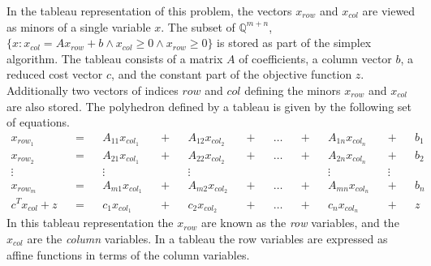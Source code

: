 \documentclass[11pt]{article} %
\begin{document}
In the tableau representation of this problem, the vectors $x_{row}$ and $x_{col}$ are viewed as minors of a single variable $x$. The subset of $\mathbb{Q}^{m+n}$, $\{x : x_{col} = Ax_{row} + b \wedge x_{col} \ge 0 \wedge x_{row} \ge 0\}$ is stored as part of the simplex algorithm. The tableau consists of a matrix $A$ of coefficients, a column vector $b$, a reduced cost vector $c$, and the constant part of the objective function $z$. Additionally two vectors of indices $row$ and $col$ defining the minors $x_{row}$ and $x_{col}$ are also stored.
The polyhedron defined by a tableau is given by the following set of equations.
\begin{equation}
  \begin{aligned}
    x_{row_1} && = && A_{11}x_{col_1} && + && A_{12}x_{col_2} && + && \dots && + && A_{1n}x_{col_n} && + && b_1 \\
    x_{row_2} && = && A_{21}x_{col_1} && + && A_{22}x_{col_2} && + && \dots && + && A_{2n}x_{col_n} && + && b_2 \\
    \vdots && && \vdots && && \vdots && && && && \vdots && \vdots \\
    x_{row_m} && = && A_{m1}x_{col_1} && + && A_{m2}x_{col_2} && + && \dots && + && A_{mn}x_{col_n} && + && b_n \\
    c^Tx_{col} + z && = && c_1x_{col_1} && + && c_2x_{col_2} && + && \dots && + && c_nx_{col_n} && + && z
  \end{aligned}
\end{equation}
In this tableau representation the $x_{row}$ are known as the \textit{row} variables, and the $x_{col}$ are the \textit{column} variables. In a tableau the row variables are expressed as affine functions in terms of the column variables.
\end{document}
